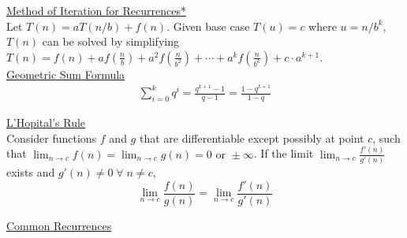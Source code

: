 \documentclass[12pt, fleqn]{general}
\begin{document}
\begin{multicols*}{2}
    {\large \underline{Method of Iteration for Recurrences*}}\\

    Let $T(n) = a T(n/b) + f(n)$. Given base case $T(u) = c$ where $u = n/b^k$, $T(n)$ can be solved by simplifying $T(n) = f(n) + a f(\frac{n}{b}) + a^2 f(\frac{n}{b^2}) + \cdots + a^k f(\frac{n}{b^k}) + c\cdot a^{k+1}$.\\

    {\large \underline{Geometric Sum Formula}}
    \begin{align*}
        \sum_{i = 0}^k q^i = \frac{q^{k+1} - 1}{q - 1} = \frac{1-q^{k+1}}{1-q}
    \end{align*}

    {\large \underline{L'Hopital's Rule}}\\

    Consider functions $f$ and $g$ that are differentiable except possibly at point $c$, such that $\lim_{n\rightarrow c} f(n) = \lim_{n\rightarrow c} g(n) = 0 \text{ or } \pm \infty$. If the limit $\lim_{n\rightarrow c}\frac{f'(n)}{g'(n)}$ exists and $g'(n) \neq 0\;\forall\; n \neq c$,
    $$
        \lim_{n\rightarrow c} \frac{f(n)}{g(n)} = \lim_{n\rightarrow c} \frac{f'(n)}{g'(n)}
    $$
    
\end{multicols*}
    

    {\large \underline{Common Recurrences}}
\end{document}
